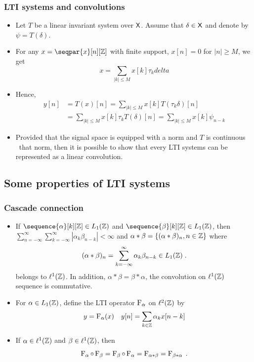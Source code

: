 \begin{frame}
\frametitle{LTI systems and convolutions}
\begin{itemize}
\item Let $T$ be a linear invariant system over $\mathsf{X}$. Assume that $\delta \in \mathsf{X}$ and denote by $\psi= T(\delta)$.
\item For any $x = \seqpar{x}[n][\zset]$ with \alert{finite support}, $x[n] = 0$ for $|n| \geq M$, we get
\[
x= \sum_{|k|\leq M} x[k] \tau_k delta 
\]
\item Hence, 
\begin{align*}
y[n]&= T(x)[n]= \sum_{|k|\leq M} x[k] T(\tau_k \delta)[n] \\
&= \sum_{|k| \leq M} x[k] \tau_k T(\delta) [n]= \sum_{|k|\leq M} x[k] \psi_{n-k}
\end{align*}
\item Provided that the signal space is equipped with a norm and $T$ is continuous \wrt\ that norm, then it is possible to show that
every LTI systems can be represented as a \alert{linear convolution}.
\end{itemize}
\end{frame}
\subsection{Some properties of LTI systems}
\begin{frame}
\frametitle{Cascade connection}
\begin{itemize}
\item If $\sequence{\alpha}[k][\zset] \in \lone(\zset)$ and $\sequence{\beta}[k][\zset] \in \lone(\zset)$, then $\sum_{n = -\infty}^\infty \sum_{k= -\infty}^{\infty} |\alpha_k \beta_{n-k}| < \infty$ and $\alpha * \beta = \{( \alpha * \beta)_n, n \in \mathbb{Z}\}$ where
    \[
    (\alpha * \beta)_n = \sum_{k=-\infty}^{\infty} \alpha_k \beta_{n-k} \in L_1(\mathbb{Z}) \;.
    \]
    belongs to $\ell^1(\mathbb{Z})$. In addition, $\alpha * \beta= \beta * \alpha$, the convolution on $\ell^1(\mathbb{Z})$ sequence is commutative.
\item For $\alpha \in L_1(\mathbb{Z})$, define the LTI operator $\operatorname{F}_{\alpha}$ on $\ell^2(\mathbb{Z})$ by
\[
y= \operatorname{F}_{\alpha}(x)   \quad y[n]= \sum_{k \in \mathbb{Z}} \alpha_k x[n-k]
\]
\item If $\alpha \in \ell^1(\mathbb{Z})$ and $\beta \in \ell^1(\mathbb{Z})$, then 
\alert{
\[
\operatorname{F}_{\alpha} \circ \operatorname{F}_{\beta} = \operatorname{F}_{\beta} \circ \operatorname{F}_{\alpha} = \operatorname{F}_{\alpha * \beta} = \operatorname{F}_{\beta * \alpha}\;.
\]
}
\end{itemize}
\end{frame}


